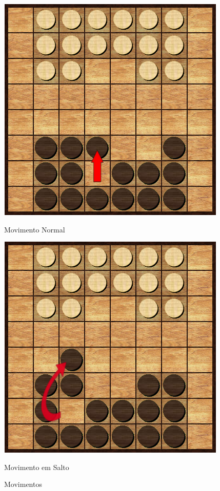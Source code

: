 \documentclass[a4paper]{article}
\begin{document}
\begin{figure}
  \begin{minipage}[b]{0.3\textwidth}
    \includegraphics[width=\textwidth]{res/normalMove.png}
    \caption{Movimento Normal}
    \label{fig:5}
  \end{minipage}
\quad\quad\quad\quad\quad\quad\quad\quad
  \begin{minipage}[b]{0.3\textwidth}
    \includegraphics[width=\textwidth]{res/jumpMove.png}
    \caption{Movimento em Salto}
    \label{fig:6}
  \end{minipage}
  \caption{Movimentos}
\end{figure}
\end{document}

